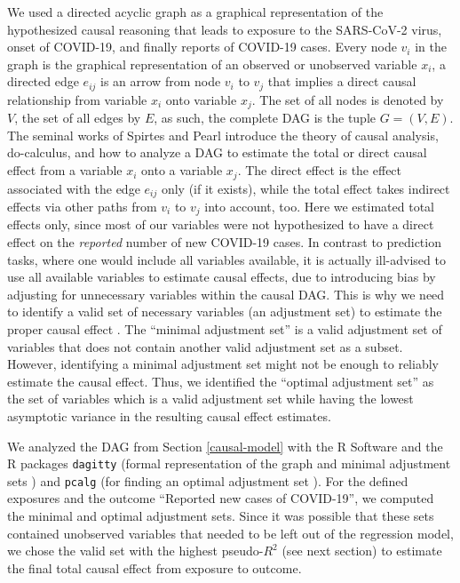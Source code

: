 \documentclass[]{elsarticle} %
\begin{document}
We used a directed acyclic graph as a graphical representation of the
hypothesized causal reasoning that leads to exposure to the SARS-CoV-2
virus, onset of COVID-19, and finally reports of COVID-19 cases. Every
node \(v_i\) in the graph is the graphical representation of an observed
or unobserved variable \(x_i\), a directed edge \(e_{ij}\) is an arrow
from node \(v_i\) to \(v_j\) that implies a direct causal relationship
from variable \(x_i\) onto variable \(x_j\). The set of all nodes is
denoted by \(V\), the set of all edges by \(E\), as such, the complete
DAG is the tuple \(G=(V,E)\). The seminal works of Spirtes and Pearl
\citep{spirtes2000causation, pearl2009causality} introduce the theory of
causal analysis, do-calculus, and how to analyze a DAG to estimate the
total or direct causal effect from a variable \(x_i\) onto a variable
\(x_j\). The direct effect is the effect associated with the edge
\(e_{ij}\) only (if it exists), while the total effect takes indirect
effects via other paths from \(v_i\) to \(v_j\) into account, too. Here
we estimated total effects only, since most of our variables were not
hypothesized to have a direct effect on the \emph{reported} number of
new COVID-19 cases. In contrast to prediction tasks, where one would
include all variables available, it is actually ill-advised to use all
available variables to estimate causal effects, due to introducing bias
by adjusting for unnecessary variables within the causal DAG. This is
why we need to identify a valid set of necessary variables (an
adjustment set) to estimate the proper causal effect
\citep{pearl2009causality}. The ``minimal adjustment set''
\citep{greenland1999causal} is a valid adjustment set of variables that
does not contain another valid adjustment set as a subset. However,
identifying a minimal adjustment set might not be enough to reliably
estimate the causal effect. Thus, we identified the ``optimal adjustment
set'' \citep{henckel2019graphical} as the set of variables which is a
valid adjustment set while having the lowest asymptotic variance in the
resulting causal effect estimates.

We analyzed the DAG from Section \ref{causal-model} with the R Software
\citep{rsoftware} and the R packages \texttt{dagitty} (formal
representation of the graph and minimal adjustment sets
\citep{textor_robust_2017}) and \texttt{pcalg} (for finding an optimal
adjustment set \citep{pcalg}). For the defined exposures and the outcome
``Reported new cases of COVID-19'', we computed the minimal and optimal
adjustment sets. Since it was possible that these sets contained
unobserved variables that needed to be left out of the regression model,
we chose the valid set with the highest pseudo-\(R^2\) (see next
section) to estimate the final total causal effect from exposure to
outcome.
\end{document}
